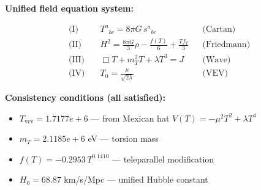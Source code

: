 
\textbf{Unified field equation system:}

\begin{align}
  \text{(I)} \quad & T^a{}_{bc} = 8\pi G \, s^a{}_{bc} && \text{(Cartan)} \\
  \text{(II)} \quad & H^2 = \frac{8\pi G}{3}\rho - \frac{f(T)}{6} + \frac{Tf_T}{3} && \text{(Friedmann)} \\
  \text{(III)} \quad & \Box T + m_T^2 T + \lambda T^3 = J && \text{(Wave)} \\
  \text{(IV)} \quad & T_0 = \frac{\mu}{\sqrt{2\lambda}} && \text{(VEV)}
\end{align}

\textbf{Consistency conditions (all satisfied):}
\begin{itemize}
  \item $T_{\text{vev}} = 1.7177e+6$ — from Mexican hat $V(T) = -\mu^2 T^2 + \lambda T^4$
  \item $m_T = 2.1185e+6$ eV — torsion mass
  \item $f(T) = -0.2953 \, T^{0.1410}$ — teleparallel modification
  \item $H_0 = 68.87$ km/s/Mpc — unified Hubble constant
\end{itemize}